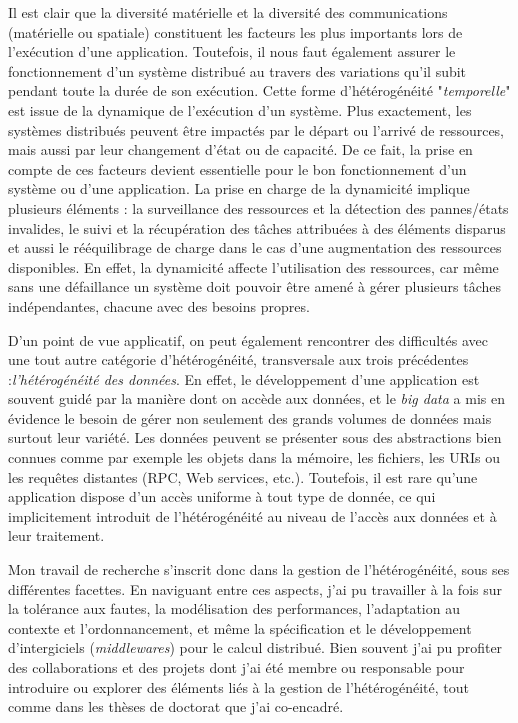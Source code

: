 Il est clair que la diversité matérielle et la diversité des communications (matérielle ou spatiale) constituent les facteurs les plus importants lors de l'exécution d'une application. Toutefois, il nous faut également assurer le fonctionnement d'un système distribué au travers des variations qu'il subit pendant toute la durée de son exécution. Cette forme d'hétérogénéité "\textit{temporelle}" est issue de la dynamique de l'exécution d'un système. Plus exactement, les systèmes distribués peuvent être impactés par le départ ou l'arrivé de ressources, mais aussi par leur changement d'état ou de capacité. De ce fait, la prise en compte de ces facteurs devient essentielle pour le bon fonctionnement d'un système ou d'une application. La prise en charge de la dynamicité implique plusieurs éléments : la surveillance des ressources et la détection des pannes/états invalides, le suivi et la récupération des tâches attribuées à des éléments disparus et aussi le rééquilibrage de charge dans le cas d'une augmentation des ressources disponibles. En effet, la dynamicité affecte l'utilisation des ressources, car même sans une défaillance un système doit pouvoir être amené à gérer plusieurs tâches indépendantes, chacune avec des besoins propres.

D'un point de vue applicatif, on peut également rencontrer des difficultés avec une tout autre catégorie d'hétérogénéité, transversale aux trois précédentes :\textit{l'hétérogénéité des données}. En effet, le développement d'une application est souvent guidé par la manière dont on accède aux données, et le \textit{big data} a mis en évidence le besoin de gérer non seulement des grands volumes de données mais surtout leur variété. Les données peuvent se présenter sous des abstractions bien connues comme par exemple les objets dans la mémoire, les fichiers, les URIs ou les requêtes distantes (RPC, Web services, etc.). Toutefois, il est rare qu'une application dispose d'un accès uniforme à tout type de donnée, ce qui implicitement introduit de l'hétérogénéité au niveau de l'accès aux données et à leur traitement. 

Mon travail de recherche s'inscrit donc dans la gestion de l'hétérogénéité, sous ses différentes facettes. En naviguant entre ces aspects, j'ai pu travailler à la fois sur la tolérance aux fautes, la modélisation des performances, l'adaptation au contexte et l'ordonnancement, et même la spécification et le développement d'intergiciels (\textit{middlewares}) pour le calcul distribué. Bien souvent j'ai pu profiter des collaborations et des projets dont j'ai été membre ou responsable pour introduire ou explorer des éléments liés à la gestion de l'hétérogénéité, tout comme dans les thèses de doctorat que j'ai co-encadré. 

